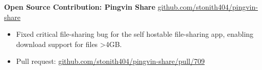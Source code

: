 \textbf{Open Source Contribution: Pingvin Share} \hfill \href{https://github.com/stonith404/pingvin-share}{github.com/stonith404/pingvin-share} \\
\vspace{-9pt}
\begin{itemize}
  \item Fixed critical file-sharing bug for the self hostable file-sharing app, enabling download support for files >4GB.
  \item Pull request: \href{https://github.com/stonith404/pingvin-share/pull/709}{github.com/stonith404/pingvin-share/pull/709}
\end{itemize}